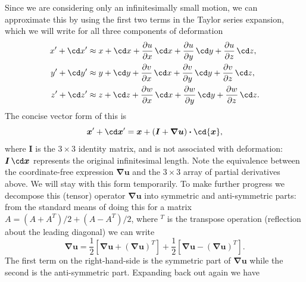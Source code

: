 \documentclass[a4paper,11pt]		{report}
\begin{document}
Since we are considering only an infinitesimally small motion, we can
approximate this by using the first two terms in the Taylor series
expansion, which we will write for all three components of deformation
\begin{align*}
x^\prime + \cd x^\prime & \approx x +\cd x +
 \frac{\partial u}{\partial x}\,\cd x +
 \frac{\partial u}{\partial y}\,\cd y +
 \frac{\partial u}{\partial z}\,\cd z,\\
y^\prime + \cd y^\prime & \approx y +\cd y +
 \frac{\partial v}{\partial x}\,\cd x +
 \frac{\partial v}{\partial y}\,\cd y +
 \frac{\partial v}{\partial z}\,\cd z,\\
z^\prime + \cd z^\prime & \approx z +\cd z +
 \frac{\partial w}{\partial x}\,\cd x +
 \frac{\partial w}{\partial y}\,\cd y +
 \frac{\partial w}{\partial z}\,\cd z.
\end{align*}
The concise vector form of this is
\[
\bm{x}^\prime + \cd\bm{x}^\prime=
\bm{x}+(\bm{I}+\bm{\nabla u})\bm{\cdot}\cd{\bm{x}},
\]
where $\bm{I}$ is the $3\times3$ identity matrix, and is not
associated with deformation: $\bm{I}\,\cd\bm{x}$ represents the
original infinitesimal length. Note the equivalence between the
coordinate-free expression $\bm{\nabla u}$ and the $3\times3$ array of
partial derivatives above. We will stay with this form temporarily. To
make further progress we decompose this (tensor) operator $\bm{\nabla
u}$ into symmetric and anti-symmetric parts: from the standard means
of doing this for a matrix $A=(A+A^T)/2+(A-A^T)/2$, where $^T$ is the
transpose operation (reflection about the leading diagonal) we can
write
\[
\bm{\nabla u} =
 \frac{1}{2}\left[\bm{\nabla u}+(\bm{\nabla u})^T\right]+
 \frac{1}{2}\left[\bm{\nabla u}-(\bm{\nabla u})^T\right].
\]
The first term on the right-hand-side is the symmetric part of
$\bm{\nabla u}$ while the second is the anti-symmetric part. Expanding
back out again we have 
\end{document}
